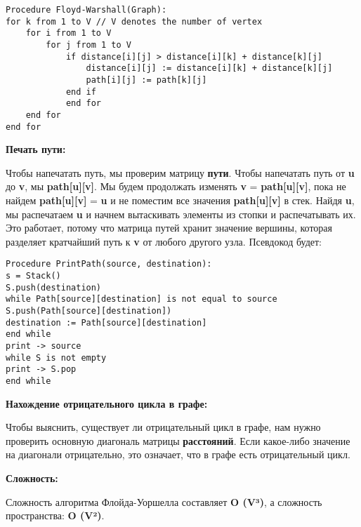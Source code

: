 \vspace{\baselineskip}
\begin{verbatim}
Procedure Floyd-Warshall(Graph):
for k from 1 to V // V denotes the number of vertex
	for i from 1 to V
		for j from 1 to V
			if distance[i][j] > distance[i][k] + distance[k][j]
				distance[i][j] := distance[i][k] + distance[k][j]
				path[i][j] := path[k][j]
			end if
			end for
	end for
end for
\end{verbatim}


\vspace{\baselineskip}
\textbf{Печать пути:}

\vspace{\baselineskip}
Чтобы напечатать путь, мы проверим матрицу \textbf{пути}. Чтобы напечатать путь от \textbf{u} до \textbf{v}, мы \textbf{path[u][v]}. Мы будем продолжать изменять \textbf{v} = \textbf{path[u][v]}, пока не найдем \textbf{path[u][v]} = \textbf{u} и не поместим все значения \textbf{path[u][v]} в стек. Найдя \textbf{u}, мы распечатаем \textbf{u} и начнем вытаскивать элементы из стопки и распечатывать их. Это работает, потому что матрица путей хранит значение вершины, которая разделяет кратчайший путь к \textbf{v} от любого другого узла. Псевдокод будет:

\vspace{\baselineskip}

\begin{verbatim}
Procedure PrintPath(source, destination):
s = Stack()
S.push(destination)
while Path[source][destination] is not equal to source
S.push(Path[source][destination])
destination := Path[source][destination]
end while
print -> source
while S is not empty
print -> S.pop
end while
\end{verbatim}


\vspace{\baselineskip}
\textbf{Нахождение отрицательного цикла в графе:}

\vspace{\baselineskip}
Чтобы выяснить, существует ли отрицательный  цикл в графе, нам нужно проверить основную диагональ матрицы \textbf{расстояний}. Если какое-либо значение на диагонали отрицательно, это означает, что в графе  есть отрицательный цикл.

\vspace{\baselineskip}
\textbf{Сложность:}
\vspace{\baselineskip}

Сложность алгоритма Флойда-Уоршелла составляет \textbf{O (V³)}, а сложность пространства: \textbf{O (V²)}.


